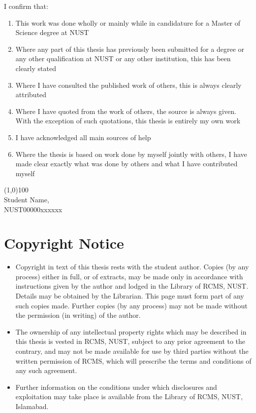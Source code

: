 \documentclass[11pt,a4paper]{report}
\numberwithin{equation}{section}
\begin{document}
    I confirm that:
    \begin{enumerate}
        \item This work was done wholly or mainly while in candidature for a Master of Science degree at NUST
        \item Where any part of this thesis has previously been submitted for a degree or any other qualification at NUST or any other institution, this has been clearly stated
        \item Where I have consulted the published work of others, this is always clearly attributed
        \item Where I have quoted from the work of others, the source is always given. With the exception of such quotations, this thesis is entirely my own work
        \item I have acknowledged all main sources of help
        \item Where the thesis is based on work done by myself jointly with others, I have made clear exactly what was done by others and what I have contributed myself
    \end{enumerate}

    \begin{flushright}
        \line(1,0){100} \\
        Student Name, \\
        NUST00000xxxxxx
    \end{flushright}

    \newpage
    \chapter*{Copyright Notice} %
    \label{cha:copyright_notice}
    \begin{itemize}
        \item Copyright in text of this thesis rests with the student author. Copies (by any process) either in full, or of extracts, may be made only in accordance with instructions given by the author and lodged in the Library of RCMS, NUST. Details may be obtained by the Librarian. This page must form part of any such copies made. Further copies (by any process) may not be made without the permission (in writing) of the author.
        \item The ownership of any intellectual property rights which may be described in this thesis is vested in RCMS, NUST, subject to any prior agreement to the contrary, and may not be made available for use by third parties without the written permission of RCMS, which will prescribe the terms and conditions of any such agreement.
        \item Further information on the conditions under which disclosures and exploitation may take place is available from the Library of RCMS, NUST, Islamabad.
    \end{itemize}
\end{document}
